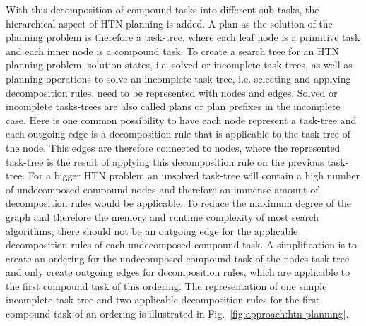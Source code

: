 With this decomposition of compound tasks into different sub-tasks, the hierarchical aspect of HTN planning is added.
A plan as the solution of the planning problem is therefore a task-tree, where each leaf node is a primitive task and each inner node is a compound task.
To create a search tree for an HTN planning problem, solution states, i.e. solved or incomplete task-trees, as well as planning operations to solve an incomplete task-tree, i.e. selecting and applying decomposition rules, need to be represented with nodes and edges.
Solved or incomplete tasks-trees are also called plans or plan prefixes in the incomplete case.\newline
Here is one common possibility to have each node represent a task-tree and each outgoing edge is a decomposition rule that is applicable to the task-tree of the node.
This edges are therefore connected to nodes, where the represented task-tree is the result of applying this decomposition rule on the previous task-tree.
For a bigger HTN problem an unsolved task-tree will contain a high number of undecomposed compound nodes and therefore an immense amount of decomposition rules would be applicable.
To reduce the maximum degree of the graph and therefore the memory and runtime complexity of most search algorithms, there should not be an outgoing edge for the applicable decomposition rules of each undecomposed compound task.
A simplification is to create an ordering for the undecomposed compound task of the nodes task tree and only create outgoing edges for decomposition rules, which are applicable to the first compound task of this ordering.
The representation of one simple incomplete task tree and two applicable decomposition rules for the first compound task of an ordering is illustrated in Fig.~\ref{fig:approach:htn-planning}.

